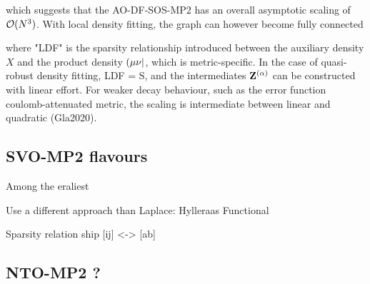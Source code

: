 \noindent which suggests that the AO-DF-SOS-MP2 has an overall asymptotic scaling of $\mathcal{O}(N^{3})$. With local density fitting, the graph can however become fully connected
\begin{center}
\end{center}

\noindent where "LDF" is the sparsity relationship introduced between the auxiliary density $X$ and the product density $\left( \mu\nu \right\rvert$, which is metric-specific. In the case of quasi-robust density fitting, LDF = S, and the intermediates $\mathbf{Z}^{(\alpha)}$ can be constructed with linear effort. For weaker decay behaviour, such as the error function coulomb-attenuated metric, the scaling is intermediate between linear and quadratic (Gla2020). 


\subsection{SVO-MP2 flavours}

Among the eraliest

Use a different approach than Laplace: Hylleraas Functional

Sparsity relation ship [ij] <-> [ab]

\subsection{NTO-MP2 ?}

